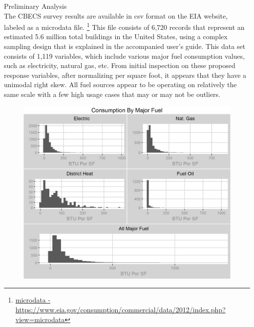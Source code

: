 {\Large {Preliminary Analysis}}
\\
The CBECS survey results are available in csv format on the EIA website, labeled as a microdata file. \footnote{\href{https://www.eia.gov/consumption/commercial/data/2012/index.php?view=microdata}{microdata - \url{https://www.eia.gov/consumption/commercial/data/2012/index.php?view=microdata}}}  This file consists of 6,720 records that represent an estimated 5.6 million total buildings in the United States, using a complex sampling design that is explained in the accompanied user's guide.  This data set consists of 1,119 variables, which include various major fuel consumption values, such as electricity, natural gas, etc.  From initial inspection on these proposed response variables, after normalizing per square foot, it appears that they have a unimodal right skew.  All fuel sources appear to be operating on relatively the same scale with a few high usage cases that may or may not be outliers. \\

\begin{figure}[h]
\includegraphics[width=\textwidth]{major_fuels_preliminary_analysis.png}
\centering
\end{figure}
